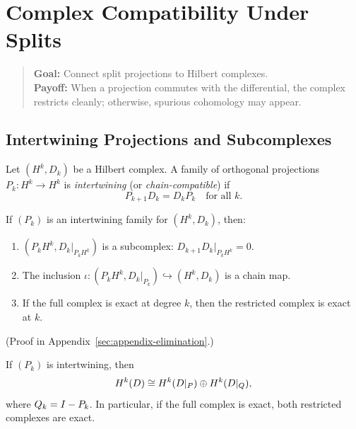 \section{Complex Compatibility Under Splits}
\label{sec:complex-compatibility}

\begin{quote}\small
\textbf{Goal:} Connect split projections to Hilbert complexes.\\
\textbf{Payoff:} When a projection commutes with the differential, the complex restricts cleanly; otherwise, spurious cohomology may appear.
\end{quote}

\subsection{Intertwining Projections and Subcomplexes}
\label{subsec:intertwining}

\begin{definition}
\label{def:intertwining}
Let $(H^k, D_k)$ be a Hilbert complex.
A family of orthogonal projections $P_k : H^k \to H^k$ is \emph{intertwining} (or \emph{chain-compatible}) if
\[
P_{k+1} D_k = D_k P_k \quad \text{for all } k.
\]
\end{definition}

\begin{theorem}
\label{thm:subcomplex}
If $(P_k)$ is an intertwining family for $(H^k, D_k)$, then:
\begin{enumerate}[label=(\roman*)]
\item $(P_k H^k, D_k|_{P_k H^k})$ is a subcomplex: $D_{k+1} D_k|_{P_k H^k} = 0$.
\item The inclusion $\iota: (P_k H^k, D_k|_{P_k}) \hookrightarrow (H^k, D_k)$ is a chain map.
\item If the full complex is exact at degree $k$, then the restricted complex is exact at $k$.
\end{enumerate}
\end{theorem}

(Proof in Appendix~\ref{sec:appendix-elimination}.)

\begin{corollary}
\label{cor:cohomology-splits}
If $(P_k)$ is intertwining, then
\[
H^{k}(D) \cong H^{k}(D|_P) \oplus H^{k}(D|_{Q}),
\]
where $Q_k = I - P_k$.
In particular, if the full complex is exact, both restricted complexes are exact.
\end{corollary}

